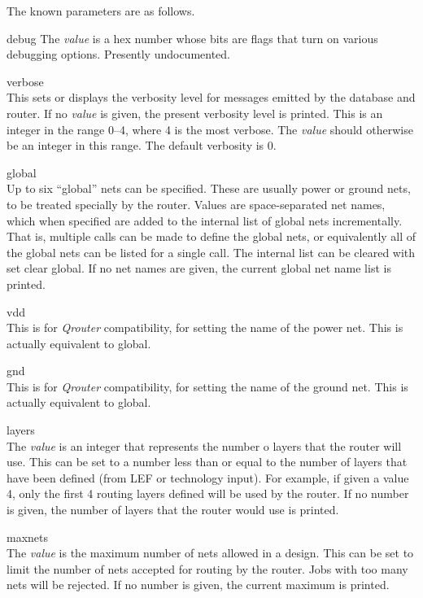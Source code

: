 The known parameters are as follows.
\begin{description}

\item{\vt debug}
The {\it value} is a hex number whose bits are flags that turn on
various debugging options.  Presently undocumented.

\item{\vt verbose}\\
This sets or displays the verbosity level for messages emitted by the
database and router.  If no {\it value} is given, the present
verbosity level is printed.  This is an integer in the range 0--4,
where 4 is the most verbose.  The {\it value} should otherwise be an
integer in this range.  The default verbosity is 0.

\item{\vt global}\\
Up to six ``global'' nets can be specified.  These are usually power
or ground nets, to be treated specially by the router.  Values are
space-separated net names, which when specified are added to the
internal list of global nets incrementally.  That is, multiple calls
can be made to define the global nets, or equivalently all of the
global nets can be listed for a single call.  The internal list can
be cleared with {\vt set clear global}.  If no net names are given,
the current global net name list is printed.

\item{\vt vdd}\\
This is for {\it Qrouter} compatibility, for setting the name of the
power net.  This is actually equivalent to {\vt global}.

\item{\vt gnd}\\
This is for {\it Qrouter} compatibility, for setting the name of the
ground net.  This is actually equivalent to {\vt global}.

\item{layers}\\
The {\it value} is an integer that represents the number o layers
that the router will use.  This can be set to a number less than or
equal to the number of layers that have been defined (from LEF or
technology input).  For example, if given a value 4, only the first 4
routing layers defined will be used by the router.  If no number is
given, the number of layers that the router would use is printed.

\item{\vt maxnets}\\
The {\it value} is the maximum number of nets allowed in a design. 
This can be set to limit the number of nets accepted for routing by
the router.  Jobs with too many nets will be rejected.  If no number
is given, the current maximum is printed.


\end{description}
